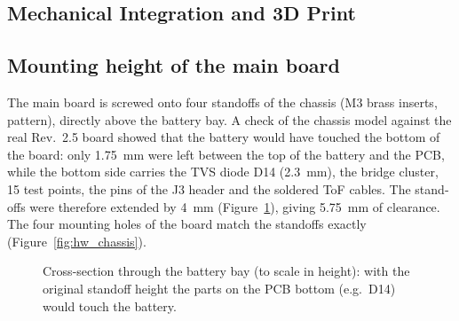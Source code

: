 \begin{otherlanguage}{english}
\section{Mechanical Integration and 3D Print}
\label{sec:hw_print}

\subsection{Mounting height of the main board}
The main board is screwed onto four standoffs of the chassis (M3 brass inserts, 
pattern), directly above the battery bay. A check of the chassis model against the real Rev.~2.5 board
showed that the battery would have touched the bottom of the board: only \SI{1.75}{\milli\metre} were left between
the top of the battery and the PCB, while the bottom side carries the TVS diode D14 (\SI{2.3}{\milli\metre}),
the bridge cluster, 15 test points, the pins of the J3 header and the soldered ToF cables.
The standoffs were therefore extended by \SI{4}{\milli\metre} (Figure~\ref{fig:hw_clearance}), giving
\SI{5.75}{\milli\metre} of clearance. The four mounting holes of the board match the standoffs exactly
(Figure~\ref{fig:hw_chassis}).

\begin{figure}[htbp]
  \centering
  \caption{Cross-section through the battery bay (to scale in height): with the original standoff height the
           parts on the PCB bottom (e.g.\ D14) would touch the battery.}
  \label{fig:hw_clearance}
\end{figure}


\end{otherlanguage}
